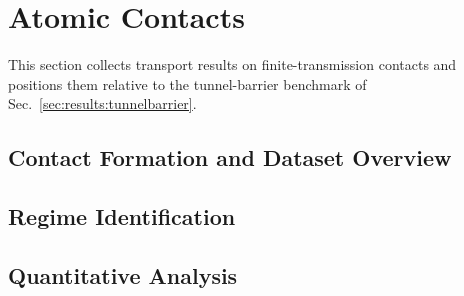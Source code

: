 \section{Atomic Contacts}
\label{sec:results:atomiccontacts}

    This section collects transport results on finite-transmission contacts and positions them relative to the tunnel-barrier benchmark of Sec.~\ref{sec:results:tunnelbarrier}.

    \subsection{Contact Formation and Dataset Overview}
    \label{subsec:results:ac:overview}


    \subsection{Regime Identification}
    \label{subsec:results:ac:regimes}


    \subsection{Quantitative Analysis}
    \label{subsec:results:ac:analysis}


